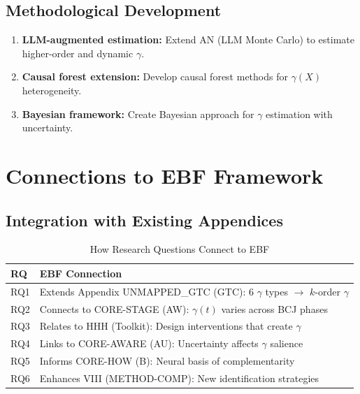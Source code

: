 \subsection{Methodological Development}

\begin{enumerate}
    \item \textbf{LLM-augmented estimation:} Extend AN (LLM Monte Carlo) to estimate higher-order and dynamic $\gamma$.

    \item \textbf{Causal forest extension:} Develop causal forest methods for $\gamma(X)$ heterogeneity.

    \item \textbf{Bayesian framework:} Create Bayesian approach for $\gamma$ estimation with uncertainty.
\end{enumerate}

\section{Connections to EBF Framework}
\label{sec:ebf-connections}

\subsection{Integration with Existing Appendices}

\begin{table}[h]
\centering
\caption{How Research Questions Connect to EBF}
\label{tab:ebf-connections}
\renewcommand{\arraystretch}{1.3}
\begin{tabular}{@{}lp{9cm}@{}}
\toprule
\textbf{RQ} & \textbf{EBF Connection} \\
\midrule
RQ1 & Extends Appendix UNMAPPED_GTC (GTC): 6 $\gamma$ types $\to$ $k$-order $\gamma$ \\
RQ2 & Connects to CORE-STAGE (AW): $\gamma(t)$ varies across BCJ phases \\
RQ3 & Relates to HHH (Toolkit): Design interventions that create $\gamma$ \\
RQ4 & Links to CORE-AWARE (AU): Uncertainty affects $\gamma$ salience \\
RQ5 & Informs CORE-HOW (B): Neural basis of complementarity \\
RQ6 & Enhances VIII (METHOD-COMP): New identification strategies \\
\bottomrule
\end{tabular}
\end{table}

